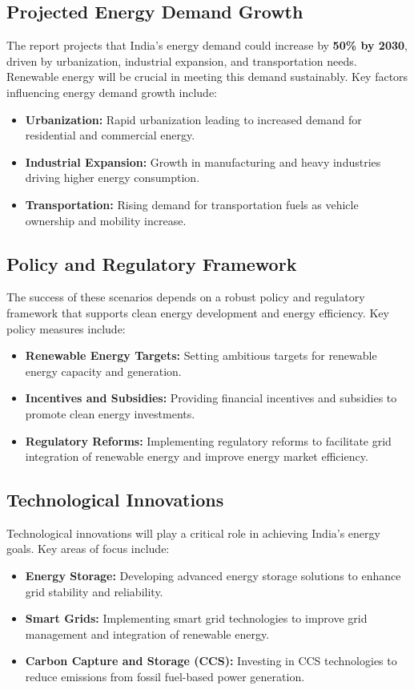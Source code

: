 \documentclass[12pt]{article}
\begin{document}
\begin{spacing}{1.5}
\subsection*{Projected Energy Demand Growth}
The report projects that India’s energy demand could increase by \textbf{50\% by 2030}, driven by urbanization, industrial expansion, and transportation needs. Renewable energy will be crucial in meeting this demand sustainably. Key factors influencing energy demand growth include:
\begin{itemize}
    \item \textbf{Urbanization:} Rapid urbanization leading to increased demand for residential and commercial energy.
    \item \textbf{Industrial Expansion:} Growth in manufacturing and heavy industries driving higher energy consumption.
    \item \textbf{Transportation:} Rising demand for transportation fuels as vehicle ownership and mobility increase.
\end{itemize}

\subsection*{Policy and Regulatory Framework}
The success of these scenarios depends on a robust policy and regulatory framework that supports clean energy development and energy efficiency. Key policy measures include:
\begin{itemize}
    \item \textbf{Renewable Energy Targets:} Setting ambitious targets for renewable energy capacity and generation.
    \item \textbf{Incentives and Subsidies:} Providing financial incentives and subsidies to promote clean energy investments.
    \item \textbf{Regulatory Reforms:} Implementing regulatory reforms to facilitate grid integration of renewable energy and improve energy market efficiency.
\end{itemize}

\subsection*{Technological Innovations}
Technological innovations will play a critical role in achieving India's energy goals. Key areas of focus include:
\begin{itemize}
    \item \textbf{Energy Storage:} Developing advanced energy storage solutions to enhance grid stability and reliability.
    \item \textbf{Smart Grids:} Implementing smart grid technologies to improve grid management and integration of renewable energy.
    \item \textbf{Carbon Capture and Storage (CCS):} Investing in CCS technologies to reduce emissions from fossil fuel-based power generation.
\end{itemize}


\end{spacing}
\end{document}
